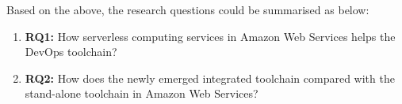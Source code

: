 \par
Based on the above, the research questions could be summarised as below:
\begin{enumerate}
    \item \textbf{RQ1:} How serverless computing services in Amazon Web Services helps the DevOps toolchain?
    \item \textbf{RQ2:} How does the newly emerged integrated toolchain compared with the stand-alone toolchain in Amazon Web Services?
\end{enumerate}
